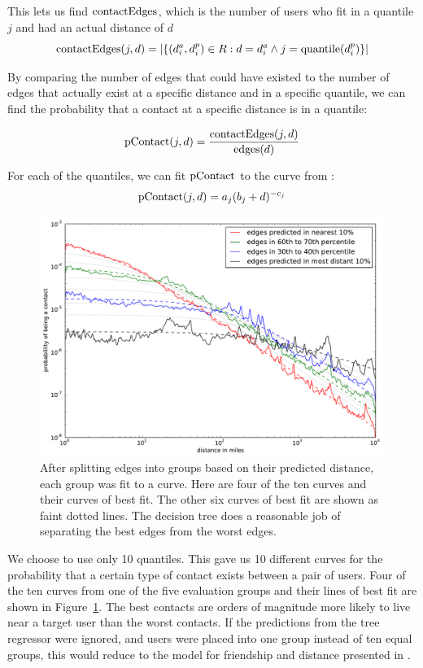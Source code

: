 This lets us find $\operatorname{contactEdges}$, which is the number of users who fit in a
quantile $j$ and had an actual distance of $d$
\[
    \operatorname{contactEdges}(j,d) = |\{
            (d^a_i,d^p_i) \in R :
            d=d^a_i \wedge j=\operatorname{quantile}(d^p_i)
        \}|
\]

By comparing the number of edges that could have existed to the number of edges
that actually exist at a specific distance and in a specific quantile, we can
find the probability that a contact at a specific distance is in a quantile:

\[
\operatorname{pContact}(j,d) = \frac{\operatorname{contactEdges}(j,d)}{\operatorname{edges}(d)}
\]

For each of the quantiles, we can fit $\operatorname{pContact}$ to the curve from
\cite{backstrom2010find}:
\[
    \operatorname{pContact}(j,d) = a_{j} (b_{j}+d)^{-c_{j}}
\]

\begin{figure}[tbh]
\centering
\includegraphics[width=\linewidth]{figures/near_prob_fit.pdf}
\caption{
After splitting edges into groups based on their predicted distance, each group
was fit to a curve. Here are four of the ten curves and their curves of best
fit. The other six curves of best fit are shown as faint dotted lines. The
decision tree does a reasonable job of separating the best edges from the worst
edges.
}
\label{fig:NearProbFit}
\end{figure}

We choose to use only 10 quantiles.
%
%
This gave us 10 different curves for the probability that a certain type of
contact exists between a pair of users.
%
Four of the ten curves from one of the five evaluation groups and their lines
of best fit are shown in Figure~\ref{fig:NearProbFit}.
%
The best contacts are orders of magnitude more
likely to live near a target user than the worst contacts.
%
If the predictions from the tree regressor were ignored, and users were placed
into one group instead of ten equal groups, this would reduce to the model
for friendship and distance presented in \cite{backstrom2010find}.


